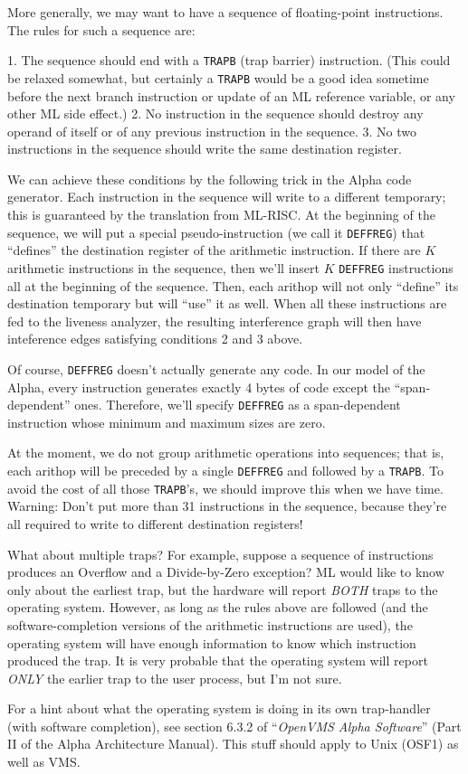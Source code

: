   More generally, we may want to have a sequence of floating-point
  instructions.  The rules for such a sequence are:

  1. The sequence should end with a \verb|TRAPB| (trap barrier) instruction.
     (This could be relaxed somewhat, but certainly a \verb|TRAPB| would
      be a good idea sometime before the next branch instruction or
      update of an ML reference variable, or any other ML side effect.)
  2. No instruction in the sequence should destroy any operand of itself
     or of any previous instruction in the sequence.
  3. No two instructions in the sequence should write the same destination
     register.

  We can achieve these conditions by the following trick in the
  Alpha code generator.  Each instruction in the sequence will write
  to a different temporary; this is guaranteed by the translation from
  ML-RISC.  At the beginning of the sequence, we will put a special
  pseudo-instruction (we call it \verb|DEFFREG|) that ``defines'' 
   the destination
  register of the arithmetic instruction.  If there are $K$ arithmetic
  instructions in the sequence, then we'll insert $K$ 
   \verb|DEFFREG| instructions
  all at the beginning of the sequence.
  Then, each arithop will not only ``define'' its destination temporary
  but will ``use'' it as well.  When all these instructions are fed to
  the liveness analyzer, the resulting interference graph will then
  have inteference edges satisfying conditions 2 and 3 above.

  Of course, \verb|DEFFREG| doesn't actually generate any code.  In our model
  of the Alpha, every instruction generates exactly 4 bytes of code
  except the ``span-dependent'' ones.  Therefore, we'll specify \verb|DEFFREG|
  as a span-dependent instruction whose minimum and maximum sizes are zero.

  At the moment, we do not group arithmetic operations into sequences;
  that is, each arithop will be preceded by a single \verb|DEFFREG| and
  followed by a \verb|TRAPB|.  To avoid the cost of all those \verb|TRAPB|'s, 
  we should improve this when we have time.  Warning:  Don't put more 
  than 31 instructions in the sequence, because they're all required
  to write to different destination registers!  

  What about multiple traps?  For example, suppose a sequence of
  instructions produces an Overflow and  a Divide-by-Zero exception?
  ML would like to know only about the earliest trap, but the hardware
  will report \emph{BOTH} traps to the operating system.  However, as long
  as the rules above are followed (and the software-completion versions
  of the arithmetic instructions are used), the operating system will
  have enough information to know which instruction produced the
  trap.  It is very probable that the operating system will report \emph{ONLY}
  the earlier trap to the user process, but I'm not sure.

  For a hint about what the operating system is doing in its own
  trap-handler (with software completion), see section 6.3.2 of
  ``\emph{OpenVMS Alpha Software}'' (Part II of the Alpha Architecture
  Manual).  This stuff should apply to Unix (OSF1) as well as VMS.
